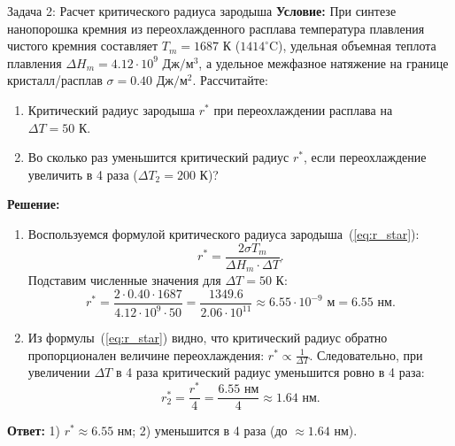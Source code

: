 \documentclass[12pt,a4paper]{article}
\begin{document}
\begin{exbox}{Задача 2: Расчет критического радиуса зародыша}
\textbf{Условие:} При синтезе нанопорошка кремния из переохлажденного расплава температура плавления чистого кремния составляет $T_m = 1687\text{ К}$ ($1414^\circ\mathrm{C}$), удельная объемная теплота плавления $\Delta H_m = 4.12 \cdot 10^9\text{ Дж}/\text{м}^3$, а удельное межфазное натяжение на границе кристалл/расплав $\sigma = 0.40\text{ Дж}/\text{м}^2$.
Рассчитайте:
\begin{enumerate}
    \item Критический радиус зародыша $r^*$ при переохлаждении расплава на $\Delta T = 50\text{ К}$.
    \item Во сколько раз уменьшится критический радиус $r^*$, если переохлаждение увеличить в 4 раза ($\Delta T_2 = 200\text{ К}$)?
\end{enumerate}

\tcbline
\textbf{Решение:}
\begin{enumerate}
    \item Воспользуемся формулой критического радиуса зародыша~(\ref{eq:r_star}):
    \begin{equation*}
    r^* = \frac{2\sigma T_m}{\Delta H_m \cdot \Delta T}.
    \end{equation*}
    Подставим численные значения для $\Delta T = 50\text{ К}$:
    \begin{equation*}
    r^* = \frac{2 \cdot 0.40 \cdot 1687}{4.12 \cdot 10^9 \cdot 50} = \frac{1349.6}{2.06 \cdot 10^{11}} \approx 6.55 \cdot 10^{-9}\text{ м} = 6.55\text{ нм}.
    \end{equation*}
    \item Из формулы~(\ref{eq:r_star}) видно, что критический радиус обратно пропорционален величине переохлаждения: $r^* \propto \frac{1}{\Delta T}$. 
    Следовательно, при увеличении $\Delta T$ в 4 раза критический радиус уменьшится ровно в 4 раза:
    \begin{equation*}
    r_2^* = \frac{r^*}{4} = \frac{6.55\text{ нм}}{4} \approx 1.64\text{ нм}.
    \end{equation*}
\end{enumerate}
\textbf{Ответ:} 1) $r^* \approx 6.55\text{ нм}$; 2) уменьшится в 4 раза (до $\approx 1.64\text{ нм}$).
\end{exbox}
\end{document}
